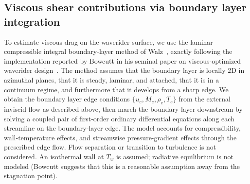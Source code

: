 \documentclass[10pt,a4paper]{article}
\begin{document}
\subsection{Viscous shear contributions via boundary layer integration}\label{sec:bl}
To estimate viscous drag on the waverider surface, we use the laminar compressible integral boundary-layer method of Walz~\citep{Walz:1969}, exactly following the implementation reported by Bowcutt in his seminal paper on viscous-optimized waverider design~\citep{Bowcutt:1986,Bowcutt:1987}. The method assumes that the boundary layer is locally 2D in azimuthal planes, that it is steady, laminar, and attached, that it is in a continuum regime, and furthermore that it develops from a sharp edge. We obtain the boundary layer edge conditions \(\{u_e, M_e, \rho_e, T_e\}\) from the external inviscid flow as described above, then march the boundary layer downstream by solving a coupled pair of first-order ordinary differential equations along each streamline on the boundary-layer edge. The model accounts for compressibility, wall-temperature effects, and streamwise pressure-gradient effects through the prescribed edge flow. Flow separation or transition to turbulence is not considered. An isothermal wall at $T_w$ is assumed; radiative equilibrium is not modeled (Bowcutt suggests that this is a reasonable assumption away from the stagnation point).
\end{document}
